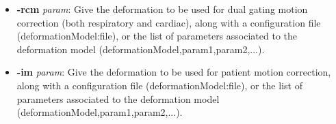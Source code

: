 \documentclass[a4paper, 11pt]{article}
\begin{document}
\begin{itemize}
\item \textbf{-rcm} \textit{param}: Give the deformation to be used for dual gating motion correction (both respiratory and cardiac), along with a configuration file (deformationModel:file), or the list of parameters associated to the deformation model (deformationModel,param1,param2,...).
\item \textbf{-im} \textit{param}: Give the deformation to be used for patient motion correction, along with a configuration file (deformationModel:file), or the list of parameters associated to the deformation model (deformationModel,param1,param2,...).
\end{itemize}


 
% 


\end{document}
